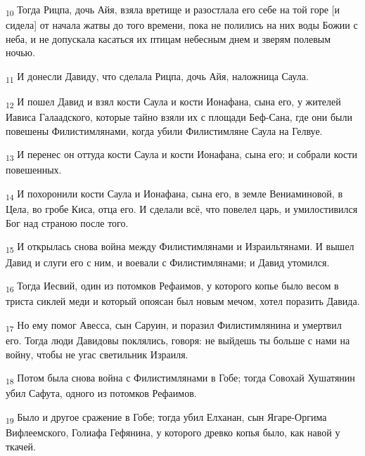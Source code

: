 \begin{tcolorbox}
\textsubscript{10} Тогда Рицпа, дочь Айя, взяла вретище и разостлала его себе на той горе [и сидела] от начала жатвы до того времени, пока не полились на них воды Божии с неба, и не допускала касаться их птицам небесным днем и зверям полевым ночью.
\end{tcolorbox}
\begin{tcolorbox}
\textsubscript{11} И донесли Давиду, что сделала Рицпа, дочь Айя, наложница Саула.
\end{tcolorbox}
\begin{tcolorbox}
\textsubscript{12} И пошел Давид и взял кости Саула и кости Ионафана, сына его, у жителей Иависа Галаадского, которые тайно взяли их с площади Беф-Сана, где они были повешены Филистимлянами, когда убили Филистимляне Саула на Гелвуе.
\end{tcolorbox}
\begin{tcolorbox}
\textsubscript{13} И перенес он оттуда кости Саула и кости Ионафана, сына его; и собрали кости повешенных.
\end{tcolorbox}
\begin{tcolorbox}
\textsubscript{14} И похоронили кости Саула и Ионафана, сына его, в земле Вениаминовой, в Цела, во гробе Киса, отца его. И сделали всё, что повелел царь, и умилостивился Бог над страною после того.
\end{tcolorbox}
\begin{tcolorbox}
\textsubscript{15} И открылась снова война между Филистимлянами и Израильтянами. И вышел Давид и слуги его с ним, и воевали с Филистимлянами; и Давид утомился.
\end{tcolorbox}
\begin{tcolorbox}
\textsubscript{16} Тогда Иесвий, один из потомков Рефаимов, у которого копье было весом в триста сиклей меди и который опоясан был новым мечом, хотел поразить Давида.
\end{tcolorbox}
\begin{tcolorbox}
\textsubscript{17} Но ему помог Авесса, сын Саруин, и поразил Филистимлянина и умертвил его. Тогда люди Давидовы поклялись, говоря: не выйдешь ты больше с нами на войну, чтобы не угас светильник Израиля.
\end{tcolorbox}
\begin{tcolorbox}
\textsubscript{18} Потом была снова война с Филистимлянами в Гобе; тогда Совохай Хушатянин убил Сафута, одного из потомков Рефаимов.
\end{tcolorbox}
\begin{tcolorbox}
\textsubscript{19} Было и другое сражение в Гобе; тогда убил Елханан, сын Ягаре-Оргима Вифлеемского, Голиафа Гефянина, у которого древко копья было, как навой у ткачей.
\end{tcolorbox}
